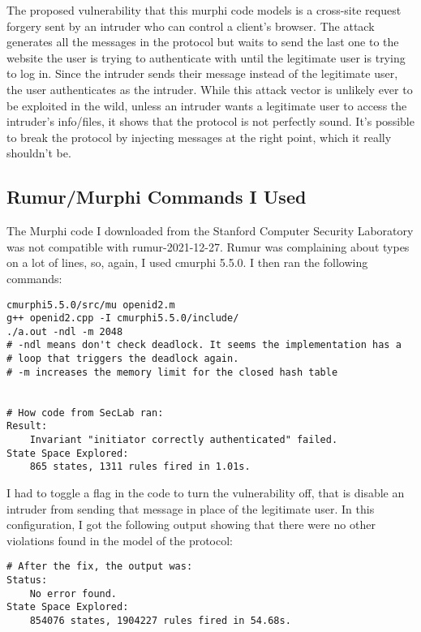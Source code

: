 \documentclass{article}
\begin{document}
The proposed vulnerability that this murphi code models is a cross-site request forgery sent by an intruder who can control a client's browser. The attack generates all the messages in the protocol but waits to send the last one to the website the user is trying to authenticate with until the legitimate user is trying to log in. Since the intruder sends their message instead of the legitimate user, the user authenticates as the intruder. While this attack vector is unlikely ever to be exploited in the wild, unless an intruder wants a legitimate user to access the intruder's info/files, it shows that the protocol is not perfectly sound. It's possible to break the protocol by injecting messages at the right point, which it really shouldn't be.

\subsection{Rumur/Murphi Commands I Used}

The Murphi code I downloaded from the Stanford Computer Security Laboratory was not compatible with rumur-2021-12-27. Rumur was complaining about types on a lot of lines, so, again, I used cmurphi 5.5.0. I then ran the following commands:

\begin{verbatim}
cmurphi5.5.0/src/mu openid2.m 
g++ openid2.cpp -I cmurphi5.5.0/include/
./a.out -ndl -m 2048
# -ndl means don't check deadlock. It seems the implementation has a
# loop that triggers the deadlock again.
# -m increases the memory limit for the closed hash table


# How code from SecLab ran:
Result:
    Invariant "initiator correctly authenticated" failed.
State Space Explored:
    865 states, 1311 rules fired in 1.01s.
\end{verbatim}

I had to toggle a flag in the code to turn the vulnerability off, that is disable an intruder from sending that message in place of the legitimate user. In this configuration, I got the following output showing that there were no other violations found in the model of the protocol:

\begin{verbatim}
# After the fix, the output was:
Status:
    No error found.
State Space Explored:
    854076 states, 1904227 rules fired in 54.68s.
\end{verbatim}
\end{document}
